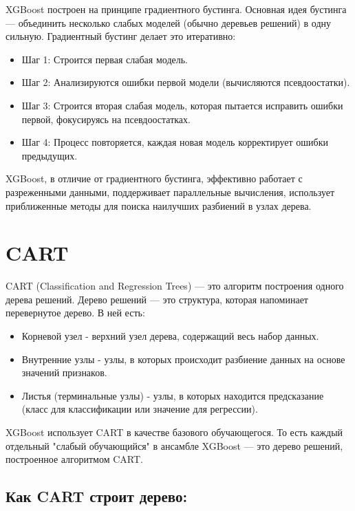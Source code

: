XGBoost построен на принципе градиентного бустинга. Основная идея бустинга — объединить несколько слабых моделей (обычно деревьев решений) в одну сильную. Градиентный бустинг делает это итеративно:

\begin{itemize}
    \item Шаг 1: Строится первая слабая модель.
    \item Шаг 2: Анализируются ошибки первой модели (вычисляются псевдоостатки).
    \item Шаг 3: Строится вторая слабая модель, которая пытается исправить ошибки первой, фокусируясь на псевдоостатках.
    \item Шаг 4: Процесс повторяется, каждая новая модель корректирует ошибки предыдущих.
\end{itemize}

XGBoost, в отличие от градиентного бустинга, эффективно работает с разреженными данными, поддерживает параллельные вычисления, использует приближенные методы для поиска наилучших разбиений в узлах дерева.

\section{CART}
CART (Classification and Regression Trees) — это алгоритм построения одного дерева решений. Дерево решений — это структура, которая напоминает перевернутое дерево. В ней есть:
\begin{itemize}
    \item Корневой узел - верхний узел дерева, содержащий весь набор данных.
    \item Внутренние узлы - узлы, в которых происходит разбиение данных на основе значений признаков.
    \item Листья (терминальные узлы) - узлы, в которых находится предсказание (класс для классификации или значение для регрессии).
\end{itemize}

XGBoost использует CART в качестве базового обучающегося. То есть каждый отдельный "слабый обучающийся" в ансамбле XGBoost — это дерево решений, построенное алгоритмом CART.

\subsection{Как CART строит дерево:}

